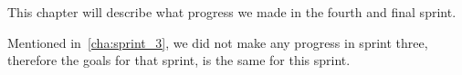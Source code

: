 This chapter will describe what progress we made in the fourth and final sprint.

Mentioned in~\autoref{cha:sprint_3}, we did not make any progress in sprint three, therefore the goals for that sprint, is the same for this sprint.
